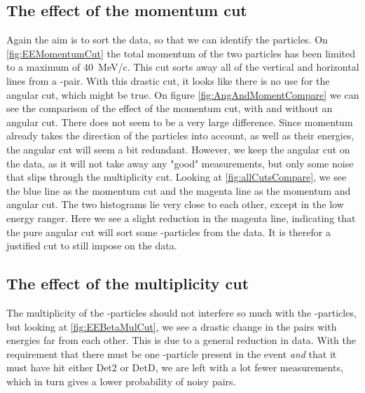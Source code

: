 \subsection{The effect of the momentum cut}
Again the aim is to sort the data, so that we can identify the particles. On \cref{fig:EEMomentumCut} the total momentum of the two particles has been limited to a maximum of \SI{40}{MeV/c}. This cut sorts away all of the vertical and horizontal lines from a \be-\al pair. With this drastic cut, it looks like there is no use for the angular cut, which might be true. On figure \ref{fig:AngAndMomentCompare} we can see the comparison of the effect of the momentum cut, with and without an angular cut. There does not seem to be a very large difference. Since momentum already takes the direction of the particles into account, as well as their energies, the angular cut will seem a bit redundant. However, we keep the angular cut on the data, as it will not take away any "good" measurements, but only some noise that slips through the multiplicity cut. Looking at \cref{fig:allCutsCompare}, we see the blue line as the momentum cut and the magenta line as the momentum and angular cut. The two histograms lie very close to each other, except in the low energy ranger. Here we see a slight reduction in the magenta line, indicating that the pure angular cut will sort some \be-particles from the data. It is therefor a justified cut to still impose on the data. 
 


\subsection{The effect of the multiplicity cut}
The multiplicity of the \be-particles should not interfere so much with the \al-particles, but looking at \cref{fig:EEBetaMulCut}, we see a drastic change in the pairs with energies far from each other. This is due to a general reduction in data. With the requirement that there must be one \be-particle present in the event \textit{and} that it must have hit either Det2 or DetD, we are left with a lot fewer measurements, which in turn gives a lower probability of noisy pairs. 

